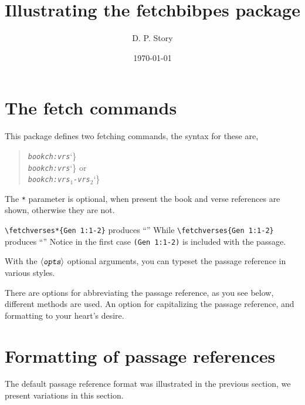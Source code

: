 \documentclass{article}
\title{Illustrating the \textsf{fetchbibpes} package}
\author{D. P. Story}
\date{\today}
\providecommand\meta[1]{\textsl{\texttt{#1}}}
\def\ameta#1{$\langle\meta{#1}\rangle$}
\providecommand\marg[1]{%
  {\ttfamily\char`\{}\meta{#1}{\ttfamily\char`\}}}
\begin{document}
\maketitle

\section{The fetch commands}

This package defines two fetching commands, the syntax for these are,
\begin{quote}\ttfamily
   \string\fetchverse[\ameta{opts}]\marg{\meta{book}\meta{ch}:\meta{vrs}}\\[3pt]
   \string\fetchverses*[\ameta{opts}]\marg{\meta{book}\meta{ch}:\meta{vrs}} or\\[3pt]
   \string\fetchverses*[\ameta{opts}]\marg{\meta{book}\meta{ch}:\meta{vrs\ensuremath{{}_1}}-\meta{vrs\ensuremath{{}_2}}}
\end{quote}
The \texttt{*} parameter is optional, when present the book and verse
references are shown, otherwise they are not.

\verb!\fetchverses*{Gen 1:1-2}! produces ``'' While
\verb!\fetchverses{Gen 1:1-2}! produces ``'' Notice in
the first case \texttt{(Gen 1:1-2)} is included with the passage.

With the \ameta{opts} optional arguments, you can typeset the
passage reference in various styles.

There are options for abbreviating the passage reference, as you see below,
different methods are used. An option for capitalizing the passage reference, and formatting
to your heart's desire.

\section{Formatting of passage references}

The default passage reference format was illustrated in the previous section,
we present variations in this section.

\medskip\noindent
{}

\medskip\noindent
{}

\medskip\noindent
{}
\end{document}
